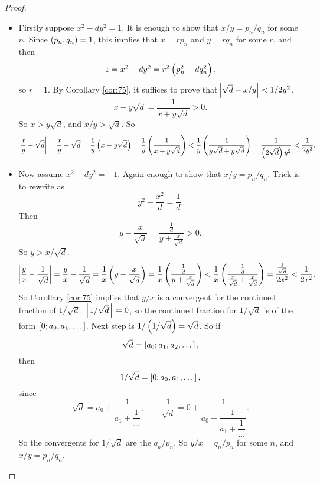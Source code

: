 \begin{proof}
\hfill
\begin{itemize}
\item Firstly suppose $ x^2 - dy^2 = 1 $. It is enough to show that $ x / y = p_n / q_n $ for some $ n $. Since $ \br{p_n, q_n} = 1 $, this implies that $ x = rp_n $ and $ y = rq_n $ for some $ r $, and then
$$ 1 = x^2 - dy^2 = r^2\br{p_n^2 - dq_n^2}, $$
so $ r = 1 $. By Corollary \ref{cor:75}, it suffices to prove that $ \abs{\sqrt{d} - x / y} < 1 / 2y^2 $.
$$ x - y\sqrt{d} = \dfrac{1}{x + y\sqrt{d}} > 0. $$
So $ x > y\sqrt{d} $, and $ x / y > \sqrt{d} $. So
$$ \abs{\dfrac{x}{y} - \sqrt{d}} = \dfrac{x}{y} - \sqrt{d} = \dfrac{1}{y}\br{x - y\sqrt{d}} = \dfrac{1}{y}\br{\dfrac{1}{x + y\sqrt{d}}} < \dfrac{1}{y}\br{\dfrac{1}{y\sqrt{d} + y\sqrt{d}}} = \dfrac{1}{\br{2\sqrt{d}}y^2} < \dfrac{1}{2y^2}. $$
\item Now assume $ x^2 - dy^2 = -1 $. Again enough to show that $ x / y = p_n / q_n $. Trick is to rewrite as
$$ y^2 - \dfrac{x^2}{d} = \dfrac{1}{d}. $$
Then
$$ y - \dfrac{x}{\sqrt{d}} = \dfrac{\tfrac{1}{d}}{y + \tfrac{x}{\sqrt{d}}} > 0. $$
So $ y > x / \sqrt{d} $.
$$ \abs{\dfrac{y}{x} - \dfrac{1}{\sqrt{d}}} = \dfrac{y}{x} - \dfrac{1}{\sqrt{d}} = \dfrac{1}{x}\br{y - \dfrac{x}{\sqrt{d}}} = \dfrac{1}{x}\br{\dfrac{\tfrac{1}{d}}{y + \tfrac{x}{\sqrt{d}}}} < \dfrac{1}{x}\br{\dfrac{\tfrac{1}{d}}{\tfrac{x}{\sqrt{d}} + \tfrac{x}{\sqrt{d}}}} = \dfrac{\tfrac{1}{\sqrt{d}}}{2x^2} < \dfrac{1}{2x^2}. $$
So Corollary \ref{cor:75} implies that $ y / x $ is a convergent for the continued fraction of $ 1 / \sqrt{d} $. $ \left\lfloor 1 / \sqrt{d} \right\rfloor = 0 $, so the continued fraction for $ 1 / \sqrt{d} $ is of the form $ \sbr{0; a_0, a_1, \dots} $. Next step is $ 1 / \br{1 / \sqrt{d}} = \sqrt{d} $. So if
$$ \sqrt{d} = \sbr{a_0; a_1, a_2, \dots}, $$
then
$$ 1 / \sqrt{d} = \sbr{0; a_0, a_1, \dots}, $$
since
$$ \sqrt{d} = a_0 + \dfrac{1}{a_1 + \dfrac{1}{\dots}}, \qquad \dfrac{1}{\sqrt{d}} = 0 + \dfrac{1}{a_0 + \dfrac{1}{a_1 + \dfrac{1}{\dots}}}. $$
So the convergents for $ 1 / \sqrt{d} $ are the $ q_n / p_n $. So $ y / x = q_n / p_n $ for some $ n $, and $ x / y = p_n / q_n $.
\end{itemize}
\end{proof}

\pagebreak

